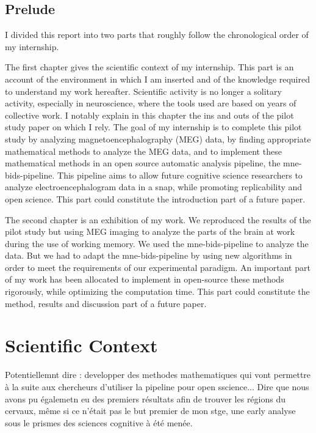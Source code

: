 \section*{Prelude}

I divided this report into two parts that roughly follow the chronological order of my internship.

The first chapter gives the scientific context of my internship. This part is an account of the environment in which I am inserted and of the knowledge required to understand my work hereafter. Scientific activity is no longer a solitary activity, especially in neuroscience, where the tools used are based on years of collective work. I notably explain in this chapter the ins and outs of the pilot study paper \cite{herbst2021abstracting} on which I rely. The goal of my internship is to complete this pilot study by analyzing magnetoencephalography (MEG) data, by finding appropriate mathematical methods to analyze the MEG data, and to implement these mathematical methods in an open source automatic analysis pipeline, the mne-bids-pipeline. This pipeline aims to allow future cognitive science researchers to analyze electroencephalogram data in a snap, while promoting replicability and open science. This part could constitute the introduction part of a future paper.

The second chapter is an exhibition of my work. We reproduced the results of the pilot study but using MEG imaging to analyze the parts of the brain at work during the use of working memory. We used the mne-bids-pipeline to analyze the data. But we had to adapt the mne-bids-pipeline by using new algorithms in order to meet the requirements of our experimental paradigm. An important part of my work has been allocated to implement in open-source these methods rigorously, while optimizing the computation time. This part could constitute the method, results and discussion part of a future paper.

\chapter{Scientific Context}

Potentiellemnt dire : developper des methodes mathematiques qui vont permettre à la suite aux chercheurs d'utiliser la pipeline pour open sscience... Dire que nous avons pu égalemetn eu des premiers résultats afin de trouver les régions du cervaux, même si ce n'était pas le but premier de mon stge, une early analyse sous le prismes des sciences cognitive à été menée.

